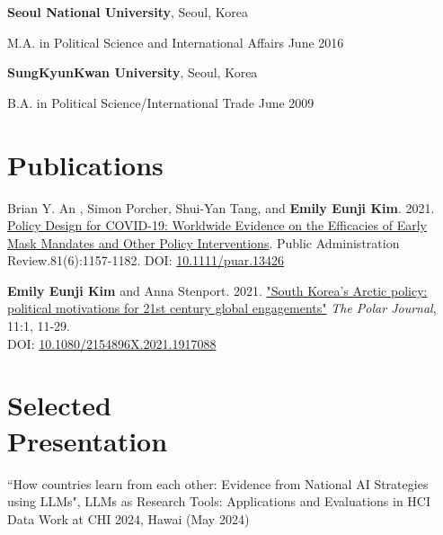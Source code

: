 \documentclass[margin,line, 10pt]{res}
\begin{document}
\begin{resume}
{\bf Seoul National University}, Seoul, Korea

\vspace{-0.4cm}
M.A. in Political Science and International Affairs \hfill {June 2016}

{\bf SungKyunKwan University}, Seoul, Korea

\vspace{-0.4cm}
B.A. in Political Science/International Trade \hfill {June 2009}

\section{\sc Publications}
Brian Y. An , Simon Porcher, Shui-Yan Tang, and \textbf{Emily Eunji Kim}. 2021. \href{https://onlinelibrary.wiley.com/doi/full/10.1111/puar.13426}{Policy Design for COVID-19: Worldwide Evidence on the Efficacies of Early Mask Mandates and Other Policy Interventions}. Public Administration Review.81(6):1157-1182. DOI: \href{https://onlinelibrary.wiley.com/doi/full/10.1111/puar.13426}{10.1111/puar.13426}\\
\vspace{-.1cm}



\textbf{Emily Eunji Kim} and Anna Stenport. 2021. \href{https://www.tandfonline.com/doi/abs/10.1080/2154896X.2021.1917088?tab=permissions&scroll=top} {"South Korea’s Arctic policy: political motivations for 21st century global engagements"} \textit{The Polar Journal}, 11:1, 11-29.\\ 
DOI: \href{https://www.tandfonline.com/doi/abs/10.1080/2154896X.2021.1917088?tab=permissions&scroll=top}{10.1080/2154896X.2021.1917088}
\vspace{-.1cm}

\section{\sc Selected\\ Presentation}
“How countries learn from each other: Evidence from National AI Strategies
using LLMs", LLMs as Research Tools: Applications and Evaluations in HCI Data Work at CHI 2024, Hawai (May 2024)
\vspace{-.1cm}


\end{resume}
\end{document}

